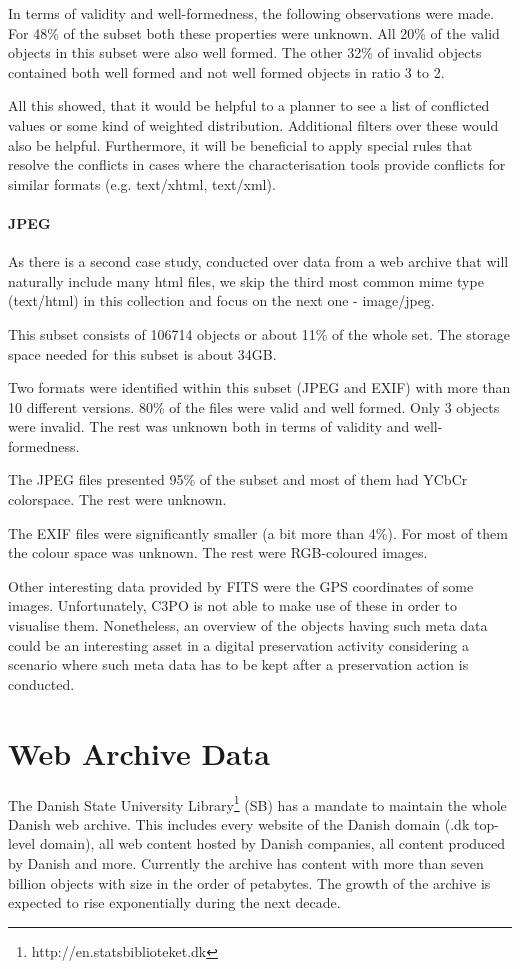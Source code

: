 In terms of validity and well-formedness, the following observations were made.
For 48\% of the subset both these properties were unknown.
All 20\% of the valid objects in this subset were also well formed.
The other 32\% of invalid objects contained both well formed and not well formed objects in ratio 3 to 2.

All this showed, that it would be helpful to a planner to see a list of conflicted values or some kind of weighted distribution. 
Additional filters over these would also be helpful.
Furthermore, it will be beneficial to apply special rules that resolve the conflicts in cases where the characterisation tools provide conflicts for similar formats (e.g. text/xhtml, text/xml).

\paragraph{JPEG}
As there is a second case study, conducted over data from a web archive that will naturally include many html files, we skip the third most common mime type (text/html) in this collection and focus on the next one -  image/jpeg.

This subset consists of 106714 objects or about 11\% of the whole set.
The storage space needed for this subset is about 34GB.

Two formats were identified within this subset (JPEG and EXIF) with more than 10 different versions.
80\% of the files were valid and well formed. Only 3 objects were invalid.
The rest was unknown both in terms of validity and well-formedness.

The JPEG files presented 95\% of the subset and most of them had YCbCr colorspace.
The rest were unknown.

The EXIF files were significantly smaller (a bit more than 4\%).
For most of them the colour space was unknown.
The rest were RGB-coloured images.

Other interesting data provided by FITS were the GPS coordinates of some images.
Unfortunately, C3PO is not able to make use of these in order to visualise them.
Nonetheless, an overview of the objects having such meta data could be an interesting asset in a digital preservation activity considering a scenario where such meta data has to be kept after a preservation action is conducted. 

\section{Web Archive Data}
The Danish State University Library\footnote{http://en.statsbiblioteket.dk} (SB) has a mandate to maintain the whole Danish web archive.
This includes every website of the Danish domain (.dk top-level domain), all web content hosted by Danish companies, all content produced by Danish and more.
Currently the archive has content with more than seven billion objects with size in the order of petabytes. The growth of the archive is expected to rise exponentially during the next decade.

